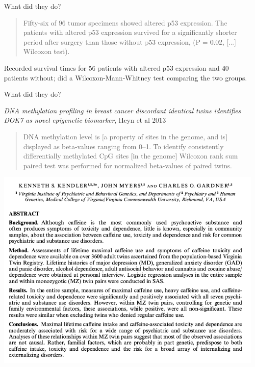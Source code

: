 
\begin{frame}{What did they do?}
    \begin{quote}
        Fifty-six of 96 tumor specimens showed altered p53 expression.  The patients with altered p53 expression survived for a significantly shorter period after surgery than those without p53 expression, (P = 0.02, [...] Wilcoxon test). 
    \end{quote}

    \pause

    Recorded survival times for 56 patients with altered p53 expression and 40 patients without;
    did a Wilcoxon-Mann-Whitney test comparing the two groups.

\end{frame}

\begin{frame}{What did they do?}

    \emph{DNA methylation profiling in breast cancer discordant identical twins identifies DOK7 as novel epigenetic biomarker}, Heyn et al 2013

    \vspace{1em}

    \begin{quote}
        DNA methylation level is [a property of sites in the genome, and is] displayed as beta-values ranging from 0--1. 
        To identify consistently differentially methylated CpG sites [in the genome] Wilcoxon rank sum paired test was performed for normalized beta-values of paired twins. 
    \end{quote}

\end{frame}

\begin{frame}{}

    \includegraphics[width=\textwidth]{caffeine-twin-study}

\end{frame}


